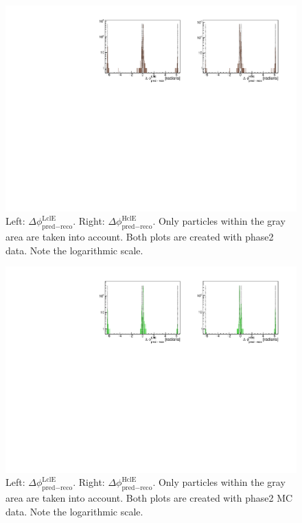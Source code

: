\documentclass[a4paper,11pt,twosided,final,german,openbib,pdftex,listof=totoc,bibliography=totoc]{scrbook}
\begin{document}
\begin{appendix}
\begin{figure}[h!]
	\centering
	\includegraphics[width=\textwidth]{Plots/master/sb2b_Data_0.pdf}
	\caption[b2bClusterPhi - clusterPhi For Phase2 Data (Whole Range)]{Left: $\Delta \phi _{\textrm{pred} - \textrm{reco}}^{\textrm{LclE}}$. Right:  $\Delta \phi _{\textrm{pred} - \textrm{reco}}^{\textrm{HclE}}$. Only particles within the gray area are taken into account. Both plots are created with phase2 data. Note the logarithmic scale.}
	\label{fig:b2bData_Whole}
\end{figure}






\begin{figure}[!htbp]
	\centering
	\includegraphics[width=\textwidth]{Plots/master/sb2b_MC_0.pdf}
	\caption[b2bClusterPhi - clusterPhi For Phase2 MC (Whole Range)]{Left: $\Delta \phi _{\textrm{pred} - \textrm{reco}}^{\textrm{LclE}}$. Right: $\Delta \phi _{\textrm{pred} - \textrm{reco}}^{\textrm{HclE}}$. Only particles within the gray area are taken into account. Both plots are created with phase2 MC data. Note the logarithmic scale.}
	\label{fig:b2bMC_Whole}
\end{figure}















\end{appendix}
\end{document}
